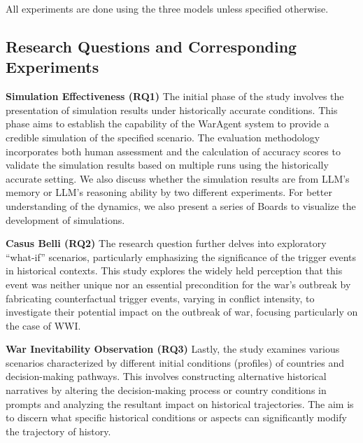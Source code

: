 \documentclass{article}
\begin{document}
All experiments are done using the three models unless specified otherwise.

\subsection{Research Questions and Corresponding Experiments}

\textbf{Simulation Effectiveness (RQ1)} The initial phase of the study involves the presentation of simulation results under historically accurate conditions. This phase aims to establish the capability of the WarAgent system to provide a credible simulation of the specified scenario. The evaluation methodology incorporates both human assessment and the calculation of accuracy scores to validate the simulation results based on multiple runs using the historically accurate setting. We also discuss whether the simulation results are from LLM's memory or LLM's reasoning ability by two different experiments. For better understanding of the dynamics, we also present a series of Boards to visualize the development of simulations.

\textbf{Casus Belli (RQ2)} 
The research question further delves into exploratory ``what-if'' scenarios, particularly emphasizing the significance of the trigger events in historical contexts. 
This study explores the widely held perception that this event was neither unique nor an essential precondition for the war's outbreak by fabricating counterfactual trigger events, varying in conflict intensity, to investigate their potential impact on the outbreak of war, focusing particularly on the case of WWI. 

\textbf{War Inevitability Observation (RQ3)} Lastly, the study examines various scenarios characterized by different initial conditions (profiles) of countries and decision-making pathways. 
This involves constructing alternative historical narratives by altering the decision-making process or country conditions in prompts and analyzing the resultant impact on historical trajectories. The aim is to discern what specific historical conditions or aspects can significantly modify the trajectory of history. 
\end{document}
